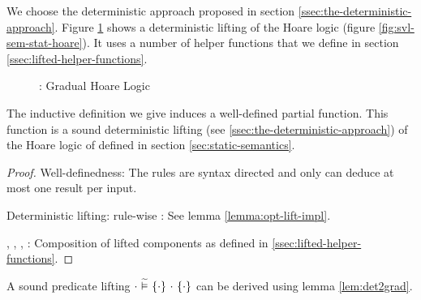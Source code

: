 We choose the deterministic approach proposed in section \ref{ssec:the-deterministic-approach}.
Figure \ref{fig:gvl-sem-stat-hoare} shows a deterministic lifting of the Hoare logic (figure \ref{fig:svl-sem-stat-hoare}).
It uses a number of helper functions that we define in section \ref{ssec:lifted-helper-functions}.
\begin{figure}[h!]
    
    \caption{\gvl: Gradual Hoare Logic} 
    \label{fig:gvl-sem-stat-hoare}
\end{figure}

\begin{lemma}
    The inductive definition we give induces a well-defined partial function.
    This function is a sound deterministic lifting (see \ref{ssec:the-deterministic-approach}) of the Hoare logic of \svlidf defined in section \ref{sec:static-semantics}.
\end{lemma}
\begin{proof}
    Well-definedness: The rules are syntax directed and only can deduce at most one result per input.
    
    Deterministic lifting: rule-wise
    :
        See lemma \ref{lemma:opt-lift-impl}.
        
    , , , :
        Composition of lifted components as defined in \ref{ssec:lifted-helper-functions}.
\end{proof}

A sound predicate lifting ${\cdot} \,\,\widetilde{\vDash}\,\, \{{\cdot}\} ~{\cdot}~ \{{\cdot}\}$ can be derived using lemma \ref{lem:det2grad}.